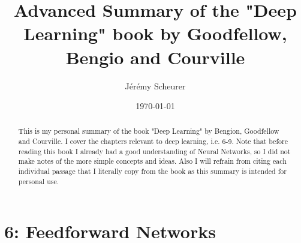 \documentclass[a4paper]{article}
\title{Advanced Summary of the "Deep Learning" book by Goodfellow, Bengio and Courville}
\author{Jérémy Scheurer}
\date{\today}
\begin{document}
\maketitle

\begin{abstract}
This is my personal summary of the book "Deep Learning" by Bengion, Goodfellow and Courville. I cover the chapters relevant to deep learning, i.e. 6-9. Note that before reading this book I already had a good understanding of Neural Networks, so I did not make notes of the more simple concepts and ideas. Also I will refrain from citing each individual passage that I literally copy from the book as this summary is intended for personal use. 
\end{abstract}

\section{6: Feedforward Networks}
\label{sec:feedforward}
\end{document}
